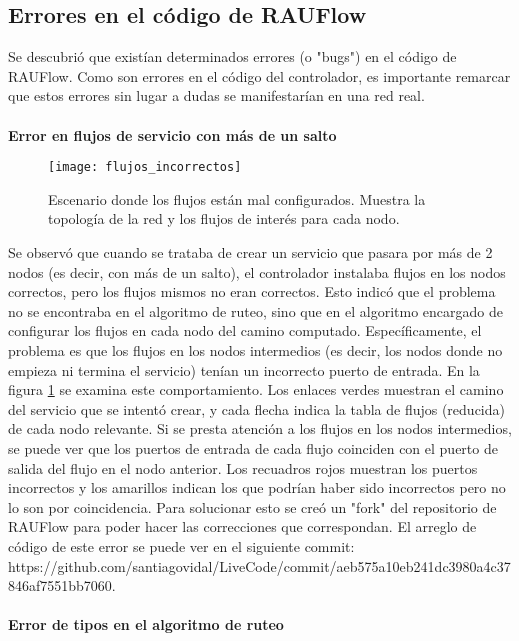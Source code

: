 \subsection{Errores en el código de RAUFlow}
Se descubrió que existían determinados errores (o "bugs") en el código de RAUFlow. Como son errores en el código del controlador, es importante remarcar que estos errores sin lugar a dudas se manifestarían en una red real. \\ \\
\textbf{Error en flujos de servicio con más de un salto} \\
\begin{figure}[t]
	\caption{Escenario donde los flujos están mal configurados. Muestra la topología de la red y los flujos de interés para cada nodo.}
	\texttt{[image: flujos\_incorrectos]}
	\centering
	\label{fig:flujos_incorrectos}
\end{figure}
Se observó que cuando se trataba de crear un servicio que pasara por más de 2 nodos (es decir, con más de un salto), el controlador instalaba flujos en los nodos correctos, pero los flujos mismos no eran correctos. Esto indicó que el problema no se encontraba en el algoritmo de ruteo, sino que en el algoritmo encargado de configurar los flujos en cada nodo del camino computado. Específicamente, el problema es que los flujos en los nodos intermedios (es decir, los nodos donde no empieza ni termina el servicio) tenían un incorrecto puerto de entrada. En la figura \ref{fig:flujos_incorrectos} se examina este comportamiento. Los enlaces verdes muestran el camino del servicio que se intentó crear, y cada flecha indica la tabla de flujos (reducida) de cada nodo relevante. Si se presta atención a los flujos en los nodos intermedios, se puede ver que los puertos de entrada de cada flujo coinciden con el puerto de salida del flujo en el nodo anterior. Los recuadros rojos muestran los puertos incorrectos y los amarillos indican los que podrían haber sido incorrectos pero no lo son por coincidencia.
Para solucionar esto se creó un "fork" del repositorio de RAUFlow para poder hacer las correcciones que correspondan. El arreglo de código de este error se puede ver en el siguiente commit: https://github.com/santiagovidal/LiveCode/commit/aeb575a10eb241dc3980a4c37846af7551bb7060. \\ \\
\textbf{Error de tipos en el algoritmo de ruteo} \\
